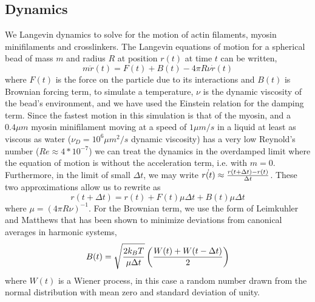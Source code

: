 \documentclass[12pt]{article} \usepackage{times} \usepackage{graphicx}
\begin{document}
\subsection{Dynamics} We Langevin dynamics to solve for the motion of actin
filaments, myosin minifilaments and crosslinkers.  The Langevin equations of
motion for a spherical bead of mass $m$ and radius $R$ at position $r(t)$ at
time $t$ can be written, \begin{equation} m\ddot{r}(t) = F(t) + B(t) - 4\pi
  R\nu \dot{r}(t) \label{eqn:lang} \end{equation} where $F(t)$ is the force on
the particle due to its interactions and $B(t)$ is Brownian forcing term, to
simulate a temperature, $\nu$ is the dynamic viscosity of the bead's
environment, and we have used the Einstein relation for the damping term.
Since the fastest motion in this simulation is that of the myosin, and a
$0.4\mu m$ myosin minifilament moving at a speed of $1\mu m/s$ in a liquid at
least as viscous as water ($\nu_D=10^6\mu m^2/s$ dynamic viscosity) has a very
low Reynold's number ($Re \approx 4*10^{-7}$) we can treat the dynamics in the
overdamped limit where the equation of motion is  without the
acceleration term, i.e. with $m=0$.  Furthermore, in the limit of small $\Delta
t$, we may write $\dot{r(t)} \approx {r(t+\Delta t)-r(t)\over \Delta t}$. These
two approximations allow us to rewrite  as \begin{equation}
  r(t+\Delta t) = r(t) + F(t)\mu \Delta t + B(t) \mu \Delta t
  \label{eqn:overdamped} \end{equation} where $\mu = (4\pi R\nu)^{-1}$. For the
Brownian term, we use the form of Leimkuhler and Matthews
\cite{leimkuhler2012,leimkuhler2013} that has been shown to minimize deviations
from canonical averages in harmonic systems, \begin{equation}
  B(t)=\sqrt{2k_BT\over\mu \Delta t}\left({W(t)+W(t-\Delta t)\over2}\right)
  \label{eqn:baoab_brownian} \end{equation} where $W(t)$ is a Wiener process,
in this case a random number drawn from the normal distribution with mean zero
and standard deviation of unity.
\end{document}
